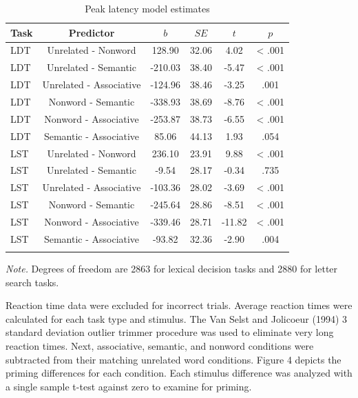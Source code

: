 \documentclass[english,man]{apa6}
\theoremstyle{definition}
\theoremstyle{definition}
\theoremstyle{definition}
\theoremstyle{remark}
\begin{document}
\begin{table}[tbp]
\begin{center}
\begin{threeparttable}
\caption{\label{tab:RT-table-est}Peak latency model estimates}
\begin{tabular}{lccccc}
\toprule
Task & Predictor & $b$ & $SE$ & $t$ & $p$\\
\midrule
LDT & Unrelated - Nonword & 128.90 & 32.06 & 4.02 & < .001\\
LDT & Unrelated - Semantic & -210.03 & 38.40 & -5.47 & < .001\\
LDT & Unrelated - Associative & -124.96 & 38.46 & -3.25 & .001\\
LDT & Nonword - Semantic & -338.93 & 38.69 & -8.76 & < .001\\
LDT & Nonword - Associative & -253.87 & 38.73 & -6.55 & < .001\\
LDT & Semantic - Associative & 85.06 & 44.13 & 1.93 & .054\\
LST & Unrelated - Nonword & 236.10 & 23.91 & 9.88 & < .001\\
LST & Unrelated - Semantic & -9.54 & 28.17 & -0.34 & .735\\
LST & Unrelated - Associative & -103.36 & 28.02 & -3.69 & < .001\\
LST & Nonword - Semantic & -245.64 & 28.86 & -8.51 & < .001\\
LST & Nonword - Associative & -339.46 & 28.71 & -11.82 & < .001\\
LST & Semantic - Associative & -93.82 & 32.36 & -2.90 & .004\\
\bottomrule
\addlinespace
\end{tabular}
\begin{tablenotes}[para]
\textit{Note.} Degrees of freedom are 2863 for lexical decision tasks and 2880 for letter search tasks.
\end{tablenotes}
\end{threeparttable}
\end{center}
\end{table}

Reaction time data were excluded for incorrect trials. Average reaction
times were calculated for each task type and stimulus. The Van Selst and
Jolicoeur (1994) 3 standard deviation outlier trimmer procedure was used
to eliminate very long reaction times. Next, associative, semantic, and
nonword conditions were subtracted from their matching unrelated word
conditions. Figure 4 depicts the priming differences for each condition.
Each stimulus difference was analyzed with a single sample t-test
against zero to examine for priming.
\end{document}
